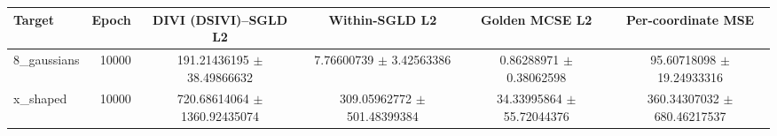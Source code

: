 \begin{tabular}{lrcccc}
\toprule
Target & Epoch & DIVI (DSIVI)--SGLD L2 & Within-SGLD L2 & Golden MCSE L2 & Per-coordinate MSE \\
\midrule
8\_gaussians & 10000 & 191.21436195 $\pm$ 38.49866632 & 7.76600739 $\pm$ 3.42563386 & 0.86288971 $\pm$ 0.38062598 & 95.60718098 $\pm$ 19.24933316 \\
x\_shaped & 10000 & 720.68614064 $\pm$ 1360.92435074 & 309.05962772 $\pm$ 501.48399384 & 34.33995864 $\pm$ 55.72044376 & 360.34307032 $\pm$ 680.46217537 \\
\bottomrule
\end{tabular}
